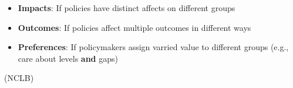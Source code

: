 \documentclass[t,aspectratio=169,11pt,presentation]{beamer}
\newenvironment{wideitemize}{\itemize\addtolength{\itemsep}{14pt}}{\enditemize}
\begin{document}
\begin{frame}{\textbf{ } }

\begin{wideitemize}
    \item 
    
    \item <2->
    \begin{itemize}
        \item<3->{\textbf{Impacts}}: If policies have distinct affects on different groups  
        \item<4->{\textbf{Outcomes}}: If policies affect multiple outcomes in different ways
        \item<5->{\textbf{Preferences}}: If policymakers assign varried value to different groups (e.g., care about levels \textbf{and} gaps)
    \end{itemize}
    
    \item<5-> (NCLB)
  
    \item<6> 
  
\end{wideitemize}

\end{frame}
\end{document}

